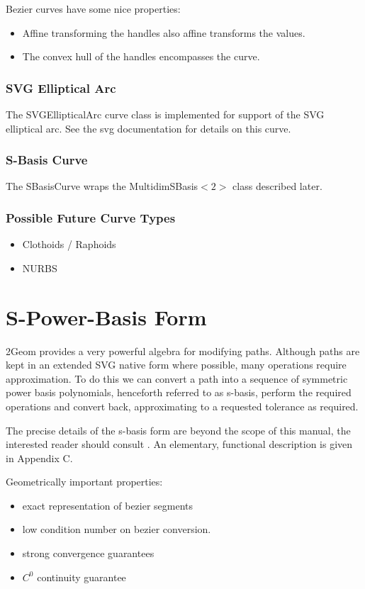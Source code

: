 \documentclass[openany]{book}
\newcommand{\code}[1]{\textsf{#1}}
\begin{document}
Bezier curves have some nice properties:
\begin{itemize}
\item Affine transforming the handles also affine transforms the values.
\item The convex hull of the handles encompasses the curve.
\end{itemize}

\subsection{SVG Elliptical Arc}
The \code{SVGEllipticalArc} curve class is implemented for support of
the SVG elliptical arc.  See the svg documentation for details on this
curve.

\subsection{S-Basis Curve}
The \code{SBasisCurve} wraps the \code{MultidimSBasis$<2>$} class
described later.

\subsection{Possible Future Curve Types}
\begin{itemize}
\item Clothoids / Raphoids
\item NURBS
\end{itemize}

\chapter{S-Power-Basis Form}

2Geom provides a very powerful algebra for modifying paths.  Although
paths are kept in an extended SVG native form where possible, many
operations require approximation.  To do this we can convert a path
into a sequence of symmetric power basis polynomials, henceforth
referred to as s-basis, perform the required operations and convert
back, approximating to a requested tolerance as required.

The precise details of the s-basis form are beyond the scope of this
manual, the interested reader should consult \cite{SanchezReyes1997,SanchezReyes2000,SanchezReyes2001,SanchezReyes2003,SanchezReyes2004}.
An elementary, functional description is given in Appendix C.

Geometrically important properties:
\begin{itemize}
\item exact representation of bezier segments
\item low condition number on bezier conversion.
\item strong convergence guarantees
\item $C^0$ continuity guarantee
\end{itemize}
\end{document}
